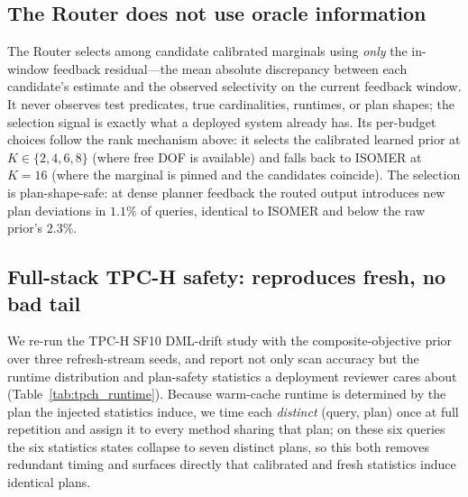 \subsection{The Router does not use oracle information}
\label{sec:mr-router}

The Router selects among candidate calibrated marginals using \emph{only} the
in-window feedback residual---the mean absolute discrepancy between each
candidate's estimate and the observed selectivity on the current feedback
window. It never observes test predicates, true cardinalities, runtimes, or plan
shapes; the selection signal is exactly what a deployed system already has. Its
per-budget choices follow the rank mechanism above: it selects the calibrated
learned prior at $K\in\{2,4,6,8\}$ (where free DOF is available) and falls back
to ISOMER at $K{=}16$ (where the marginal is pinned and the candidates coincide).
The selection is plan-shape-safe: at dense planner feedback the routed output
introduces new plan deviations in $1.1\%$ of queries, identical to ISOMER and
below the raw prior's $2.3\%$.

\subsection{Full-stack TPC-H safety: reproduces fresh, no bad tail}
\label{sec:mr-tpch}

We re-run the TPC-H SF10 DML-drift study with the composite-objective prior over
three refresh-stream seeds, and report not only scan accuracy but the runtime
distribution and plan-safety statistics a deployment reviewer cares about
(Table~\ref{tab:tpch_runtime}). Because warm-cache runtime is determined by the
plan the injected statistics induce, we time each \emph{distinct} (query, plan)
once at full repetition and assign it to every method sharing that plan; on these
six queries the six statistics states collapse to seven distinct plans, so this
both removes redundant timing and surfaces directly that calibrated and fresh
statistics induce identical plans.

